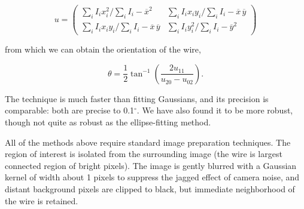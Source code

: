 \begin{equation}
u = \left( \begin{array}{cc}
\sum_{i} I_i x_i^2 / \sum_i I_i - \overline{x}^2 & \sum_{i} I_i x_i y_i / \sum_i I_i - \overline{x}\,\overline{y} \\
\sum_{i} I_i x_i y_i / \sum_i I_i - \overline{x}\,\overline{y} & \sum_{i} I_i y_i^2 / \sum_i I_i - \overline{y}^2\end{array} \right)
\end{equation}

\noindent from which we can obtain the orientation of the wire,

\begin{equation}
\theta = \frac{1}{2}\tan^{-1}\left(\frac{2u_{11}}{u_{20} - u_{02}}\right).
\end{equation}

\noindent The technique is much faster than fitting Gaussians, and its precision is comparable: both are precise to 0.1$^\circ$. We have also found it to be more robust, though not quite as robust as the ellipse-fitting method.

All of the methods above require standard image preparation techniques. The region of interest is isolated from the surrounding image (the wire is largest connected region of bright pixels). The image is gently blurred with a Gaussian kernel of width about 1 pixels to suppress the jagged effect of camera noise, and distant background pixels are clipped to black, but immediate neighborhood of the wire is retained.